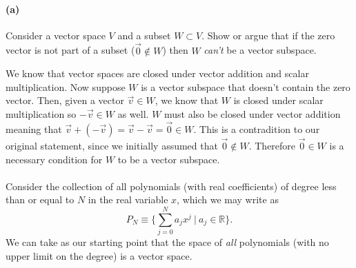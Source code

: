 \documentclass{article}
\begin{document}
\paragraph{(a)}
Consider a vector space $V$ and a subset $W\subset V$.  Show or argue that if the zero vector is not part of a subset ($\vec{0}\notin W$) then $W$ \emph{can't} be a vector subspace.\\

\begin{solution}
    We know that vector spaces are closed under vector addition and scalar multiplication. Now suppose $W$ is a vector subspace that doesn't contain the zero vector. Then, given a vector $\vec v \in W$, we know that $W$ is closed under scalar multiplication so $-\vec v \in W$ as well. $W$ must also be closed under vector addition meaning that $\vec v + (-\vec v) = \vec v - \vec v = \vec 0 \in W$. This is a contradition to our original statement, since we initially assumed that $\vec 0 \not \in W$. Therefore $\vec 0 \in W$ is a necessary condition for $W$ to be a vector subspace.
\end{solution}


\phline
\paragraph{}
Consider the collection of all polynomials (with real coefficients) of degree less than or equal to $N$ in the real variable $x$, which we may write as
	\begin{equation}
		P_{N} \equiv \Bigg\{\sum_{j=0}^{N} a_{j}x^{j}\ \Bigg|\ a_{j}\in\mathbb{R}\Bigg\}.
	\label{polynomials}
	\end{equation}
We can take as our starting point that the space of \emph{all} polynomials (with no upper limit on the degree) is a vector space.

\end{document}
